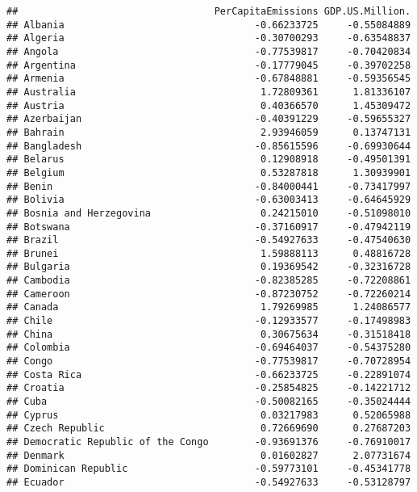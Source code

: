 \documentclass[
]{article}
\begin{document}
\begin{verbatim}
##                                  PerCapitaEmissions GDP.US.Million.
## Albania                                 -0.66233725     -0.55084889
## Algeria                                 -0.30700293     -0.63548837
## Angola                                  -0.77539817     -0.70420834
## Argentina                               -0.17779045     -0.39702258
## Armenia                                 -0.67848881     -0.59356545
## Australia                                1.72809361      1.81336107
## Austria                                  0.40366570      1.45309472
## Azerbaijan                              -0.40391229     -0.59655327
## Bahrain                                  2.93946059      0.13747131
## Bangladesh                              -0.85615596     -0.69930644
## Belarus                                  0.12908918     -0.49501391
## Belgium                                  0.53287818      1.30939901
## Benin                                   -0.84000441     -0.73417997
## Bolivia                                 -0.63003413     -0.64645929
## Bosnia and Herzegovina                   0.24215010     -0.51098010
## Botswana                                -0.37160917     -0.47942119
## Brazil                                  -0.54927633     -0.47540630
## Brunei                                   1.59888113      0.48816728
## Bulgaria                                 0.19369542     -0.32316728
## Cambodia                                -0.82385285     -0.72208861
## Cameroon                                -0.87230752     -0.72260214
## Canada                                   1.79269985      1.24086577
## Chile                                   -0.12933577     -0.17498983
## China                                    0.30675634     -0.31518418
## Colombia                                -0.69464037     -0.54375280
## Congo                                   -0.77539817     -0.70728954
## Costa Rica                              -0.66233725     -0.22891074
## Croatia                                 -0.25854825     -0.14221712
## Cuba                                    -0.50082165     -0.35024444
## Cyprus                                   0.03217983      0.52065988
## Czech Republic                           0.72669690      0.27687203
## Democratic Republic of the Congo        -0.93691376     -0.76910017
## Denmark                                  0.01602827      2.07731674
## Dominican Republic                      -0.59773101     -0.45341778
## Ecuador                                 -0.54927633     -0.53128797

\end{verbatim}
\end{document}
